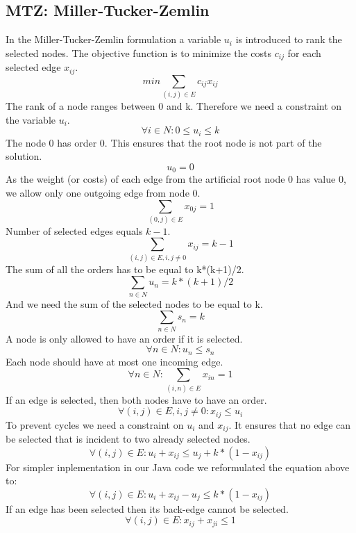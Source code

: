 \documentclass{article}
\begin{document}
\subsection{MTZ: Miller-Tucker-Zemlin \label{mtz}}
In the Miller-Tucker-Zemlin formulation a variable $u_i$ is introduced to rank the selected nodes. The objective function is to minimize the costs $c_{ij}$ for each selected edge $x_{ij}$.
\setcounter{equation}{0}
\begin{equation}
min \sum_{(i,j) \in E} c_{ij} x_{ij}
\end{equation}
The rank of a node ranges between 0 and k. Therefore we need a constraint on the variable $u_i$.
\begin{equation}
\forall i \in N : 0 \le u_i \le k
\end{equation}
The node 0 has order 0. This ensures that the root node is not part of the solution.
\begin{equation}
u_0 = 0
\end{equation}
As the weight (or costs) of each edge from the artificial root node 0 has value 0, we allow only one outgoing edge from node 0.
\begin{equation}
\sum_{(0,j) \in E} x_{0j} = 1
\end{equation}
Number of selected edges equals $k-1$.
\begin{equation}
\sum_{(i,j) \in E, i,j \not= 0} x_{ij} = k - 1
\end{equation}
The sum of all the orders has to be equal to k*(k+1)/2.
\begin{equation}
\sum_{n \in N} u_n = k*(k+1)/2
\end{equation}
And we need the sum of the selected nodes to be equal to k.
\begin{equation}
\sum_{n \in N} s_n = k
\end{equation}
A node is only allowed to have an order if it is selected.
\begin{equation}
\forall n \in N: u_n \le s_n
\end{equation}
Each node should have at most one incoming edge.
\begin{equation}
\forall n \in N: \sum_{(i,n) \in E} x_{in} = 1
\end{equation}
If an edge is selected, then both nodes have to have an order.
\begin{equation}
\forall (i,j) \in E, i,j \not= 0: x_{ij} \le u_i
\end{equation}
To prevent cycles we need a constraint on $u_i$ and $x_{ij}$. It ensures that no edge can be selected that is incident to two already selected nodes.
\begin{equation}
\forall (i,j) \in E : u_i + x_{ij} \le u_j + k * ( 1 - x_{ij})
\end{equation}
For simpler inplementation in our Java code we reformulated the equation above to:
\setcounter{equation}{10}
\begin{equation}
\forall (i,j) \in E : u_i + x_{ij} - u_j \le k * ( 1 - x_{ij})
\end{equation}
If an edge has been selected then its back-edge cannot be selected.
\begin{equation}
\forall (i,j) \in E: x_{ij} + x_{ji} \le 1
\end{equation}
\end{document}
